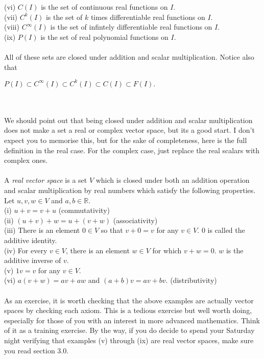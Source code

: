\documentclass{amsart}
\begin{document}
(vi) $C(I)$ is the set of continuous real functions on $I$.\\ 
(vii) $C^{k}(I)$ is the set of $k$ times differentiable real functions on $I$.\\
(viii) $C^{\infty}(I)$ is the set of infintely differentiable real functions on $I$.\\
(ix) $P(I)$ is the set of real polynomial functions on $I$.\\
\\
All of these sets are closed under addition and scalar multiplication. Notice also that\\
\centerline{$P(I)\subset C^{\infty}(I)\subset C^{k}(I)\subset C(I)\subset F(I).$}\\
\\
We should point out that being closed under addition and scalar multiplication does not make a set a real or complex vector space, but its a good start. I don't expect you to memorise this, but for the sake of completeness, here is the full definition in the real case. For the complex case, just replace the real scalars with complex ones.\\
\\
A {\it real vector space} is a set $V$ which is closed under both an addition operation and scalar multiplication by real numbers which satisfy the following properties. Let $u,v,w\in V$ and $a,b\in\mathbb{R}$.\\
(i) $u+v=v+u$ (commutativity)\\
(ii) $(u+v)+w=u+(v+w)$ (associativity)\\
(iii) There is an element $0\in V$ so that $v+0=v$ for any $v\in V$. $0$ is called the additive identity.\\
(iv) For every $v\in V$, there is an element $w\in V$ for which $v+w=0$. $w$ is the additive inverse of $v$.\\
(v) $1v=v$ for any $v\in V$.\\
(vi) $a(v+w)=av+aw$ and $(a+b)v=av+bv.$ (distributivity) 
\\\\
As an exercise, it is worth checking that the above examples are actually vector spaces by checking each axiom. This is a tedious exercise but well worth doing, especially for those of you with an interest in more advanced mathematics. Think of it as a training exercise. By the way, if you do decide to spend your Saturday night verifying that examples (v) through (ix) are real vector spaces, make sure you read section 3.0.\\
\end{document}
